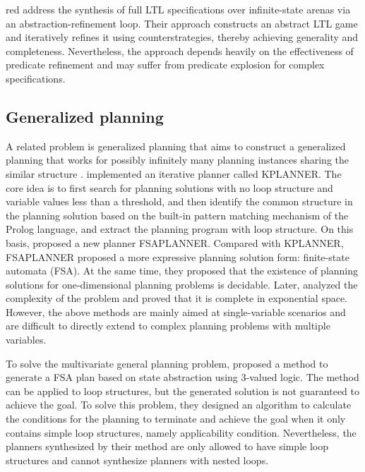 \documentclass[review]{elsarticle}
\begin{document}
\begin{color}{red}
\citet{AzzopardiPDS2025} address the synthesis of full LTL specifications over infinite-state arenas via an abstraction-refinement loop. 
Their approach constructs an abstract LTL game and iteratively refines it using counterstrategies, thereby achieving generality and completeness. 
Nevertheless, the approach depends heavily on the effectiveness of predicate refinement and may suffer from predicate explosion for complex specifications. 
\end{color}

\subsection{Generalized planning} 
A related problem is generalized planning that aims to construct a generalized planning that works for possibly infinitely many planning instances sharing the similar structure \cite{Lev2005}.
\citet{Lev2005} implemented an iterative planner called KPLANNER. The core idea is to first search for planning solutions with no loop structure and variable values less than a threshold, and then identify the common structure in the planning solution based on the built-in pattern matching mechanism of the Prolog language, and extract the planning program with loop structure. On this basis, \citet{HuL2010} proposed a new planner FSAPLANNER. Compared with KPLANNER, FSAPLANNER proposed a more expressive planning solution form: finite-state automata (FSA). At the same time, they proposed that the existence of planning solutions for one-dimensional planning problems is decidable. Later, \citet{HuG2011} analyzed the complexity of the problem and proved that it is complete in exponential space. However, the above methods are mainly aimed at single-variable scenarios and are difficult to directly extend to complex planning problems with multiple variables.

To solve the multivariate general planning problem, \citet{SriIZ2011} proposed a method to generate a FSA plan based on state abstraction using 3-valued logic. The method can be applied to loop structures, but the generated solution is not guaranteed to achieve the goal. To solve this problem, they designed an algorithm to calculate the conditions for the planning to terminate and achieve the goal when it only contains simple loop structures, namely applicability
condition\cite{SriIZ2012}. Nevertheless, the planners synthesized by their method are only allowed to have simple loop structures and cannot synthesize planners with nested loops.
\end{document}
